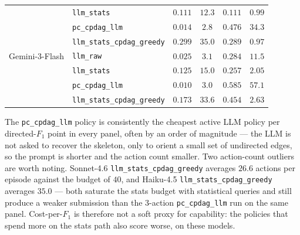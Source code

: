 \begin{center}
\begin{tabular}{@{}l l c c c c@{}}
                & \texttt{llm\_stats}              & $0.111$ & $12.3$ & $0.111$ & $0.99$ \\
                & \texttt{pc\_cpdag\_llm}          & $0.014$ & $2.8$  & $0.476$ & $34.3$ \\
                & \texttt{llm\_stats\_cpdag\_greedy} & $0.299$ & $35.0$ & $0.289$ & $0.97$ \\
\midrule
Gemini-3-Flash  & \texttt{llm\_raw}                & $0.025$ & $3.1$  & $0.284$ & $11.5$ \\
                & \texttt{llm\_stats}              & $0.125$ & $15.0$ & $0.257$ & $2.05$ \\
                & \texttt{pc\_cpdag\_llm}          & $0.010$ & $3.0$  & $0.585$ & $57.1$ \\
                & \texttt{llm\_stats\_cpdag\_greedy} & $0.173$ & $33.6$ & $0.454$ & $2.63$ \\
\bottomrule
\end{tabular}
\end{center}

The \texttt{pc\_cpdag\_llm} policy is consistently the cheapest active LLM policy per directed-$F_1$ point in every panel, often by an order of magnitude --- the LLM is not asked to recover the skeleton, only to orient a small set of undirected edges, so the prompt is shorter and the action count smaller. Two action-count outliers are worth noting. Sonnet-4.6 \texttt{llm\_stats\_cpdag\_greedy} averages $26.6$ actions per episode against the budget of $40$, and Haiku-4.5 \texttt{llm\_stats\_cpdag\_greedy} averages $35.0$ --- both saturate the stats budget with statistical queries and still produce a weaker submission than the $3$-action \texttt{pc\_cpdag\_llm} run on the same panel. Cost-per-$F_1$ is therefore not a soft proxy for capability: the policies that spend more on the stats path also score worse, on these models.
